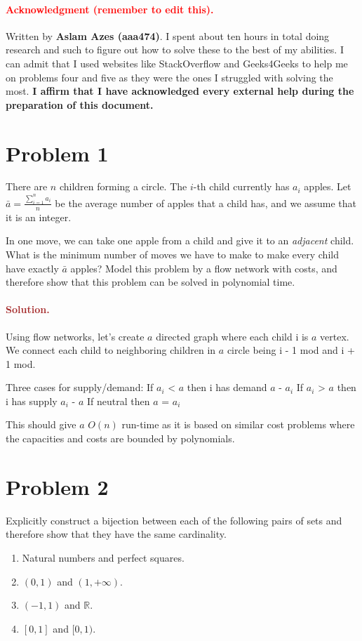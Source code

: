 \paragraph{\textcolor{red}{Acknowledgment (remember to edit this).}} Written by \textbf{Aslam Azes (aaa474)}. I spent about ten hours in total doing research and such to figure out how to solve these to the best of my abilities. I can admit that I used websites like StackOverflow and Geeks4Geeks to help me on problems four and five as they were the ones I struggled with solving the most. \textbf{I affirm that I have acknowledged every external help during the preparation of this document.}


\section*{Problem 1}
There are $n$ children forming a circle. The $i$-th child currently has $a_i$ apples. Let $\bar a = \frac{\sum_{i = 1}^n a_i}{n}$ be the average number of apples that a child has, and we assume that it is an integer.

In one move, we can take one apple from a child and give it to an \emph{adjacent} child. What is the minimum number of moves we have to make to make every child have exactly $\bar a$ apples? Model this problem by a flow network with costs, and therefore show that this problem can be solved in polynomial time.

\paragraph{\textcolor{brown}{Solution.}}
Using flow networks, let's create $a$ directed graph where each child i is $a$ vertex. We connect each child to neighboring children in $a$ circle being i - 1 mod and i + 1 mod.

Three cases for supply/demand: 
    If $a_i$ < $a$ then i has demand $a$ - $a_i$
    If $a_i$ > $a$ then i has supply $a_i$ - $a$
    If neutral then $a$ = $a_i$

This should give $a$ $O(n)$ run-time as it is based on similar cost problems where the capacities and costs are bounded by polynomials.

\section*{Problem 2}
Explicitly construct a bijection between each of the following pairs of sets and therefore show that they have the same cardinality.
\begin{enumerate}
    \item Natural numbers and perfect squares.
    \item $(0, 1)$ and $(1, +\infty)$.
    \item $(-1, 1)$ and $\mathbb{R}$.
    \item $[0, 1]$ and $[0, 1)$.
\end{enumerate}


